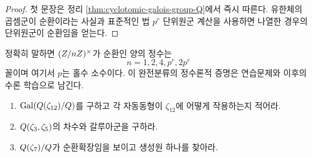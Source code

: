 \begin{proof}
첫 문장은 정리 \ref{thm:cyclotomic-galois-group-Q}에서 즉시 따른다. 유한체의 곱셈군이 순환이라는 사실과 표준적인 법 $p^r$ 단위원군 계산을 사용하면 나열한 경우의 단위원군이 순환임을 얻는다.
\end{proof}

\begin{remark}
정확히 말하면 $(Z/nZ)^\times$가 순환인 양의 정수는
\[
  n=1,2,4,p^r,2p^r
\]
꼴이며 여기서 $p$는 홀수 소수이다. 이 완전분류의 정수론적 증명은 연습문제와 이후의 수론 학습으로 남긴다.
\end{remark}

\begin{checkpoint}
\begin{enumerate}[label=(\alph*)]
  \item $\operatorname{Gal}(Q(\zeta_{12})/Q)$를 구하고 각 자동동형이 $\zeta_{12}$에 어떻게 작용하는지 적어라.
  \item $Q(\zeta_3,\zeta_5)$의 차수와 갈루아군을 구하라.
  \item $Q(\zeta_7)/Q$가 순환확장임을 보이고 생성원 하나를 찾아라.
\end{enumerate}
\end{checkpoint}

